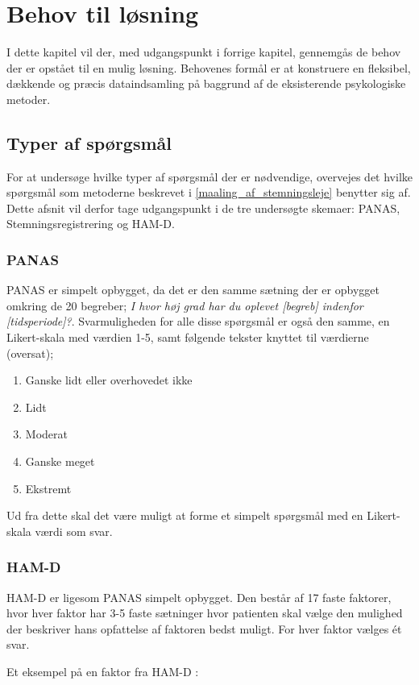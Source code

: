 \chapter{Behov til løsning}\label{krav}
I dette kapitel vil der, med udgangspunkt i forrige kapitel, gennemgås de behov der er opstået til en mulig løsning.
Behovenes formål er at konstruere en fleksibel, dækkende og præcis dataindsamling på baggrund af de eksisterende psykologiske metoder.

\section{Typer af spørgsmål}
For at undersøge hvilke typer af spørgsmål der er nødvendige, overvejes det hvilke spørgsmål som metoderne beskrevet i \cref{maaling_af_stemningsleje} benytter sig af.
Dette afsnit vil derfor tage udgangspunkt i de tre undersøgte skemaer: PANAS, Stemningsregistrering og HAM-D.

\subsection{PANAS} 
PANAS er simpelt opbygget, da det er den samme sætning der er opbygget omkring de 20 begreber; \textit{I hvor høj grad har du oplevet [begreb] indenfor [tidsperiode]?}.
Svarmuligheden for alle disse spørgsmål er også den samme, en Likert-skala\cite{likert} med værdien 1-5, samt følgende tekster knyttet til værdierne (oversat);
\begin{enumerate}
\item Ganske lidt eller overhovedet ikke
\item Lidt
\item Moderat
\item Ganske meget
\item Ekstremt
\end{enumerate}

Ud fra dette skal det være muligt at forme et simpelt spørgsmål med en Likert-skala værdi som svar.

\subsection{HAM-D} 
HAM-D er ligesom PANAS simpelt opbygget.
Den består af 17 faste faktorer, hvor hver faktor har 3-5 faste sætninger hvor patienten skal vælge den mulighed der beskriver hans opfattelse af faktoren bedst muligt.
For hver faktor vælges ét svar.

\noindent
Et eksempel på en faktor fra HAM-D \cite{ham_d}:\\

